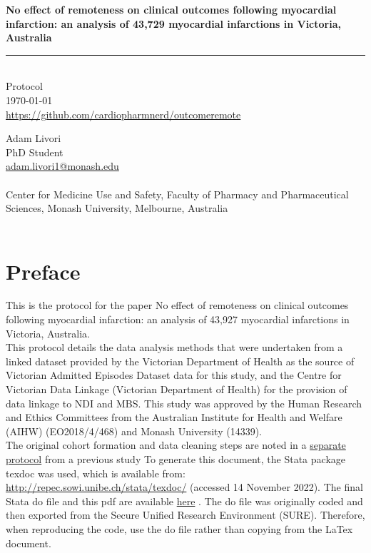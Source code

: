 \documentclass[11pt]{article}
\newcommand{\thedate}{\today}
\begin{document}
\begin{titlepage}
  \begin{flushright}
        \Huge
        \textbf{No effect of remoteness on clinical outcomes following myocardial infarction: an analysis of 43,729 myocardial infarctions in Victoria, Australia}
\color{violet}
\rule{16cm}{2mm} \\
\Large
\color{black}
Protocol \\
\thedate \\
\color{blue}
\url{https://github.com/cardiopharmnerd/outcomeremote} \\
\color{black}
       \vfill
    \end{flushright}
        \Large

\noindent
Adam Livori \\
PhD Student \\
\color{blue}
\href{mailto:adam.livori1@Monash.edu}{adam.livori1@monash.edu} \\ 
\color{black}
\\
Center for Medicine Use and Safety, Faculty of Pharmacy and Pharmaceutical Sciences, Monash University, Melbourne, Australia \\
\\
\end{titlepage}

\pagebreak
\tableofcontents
\pagebreak

\pagebreak
\section{Preface}

This is the protocol for the paper No effect of remoteness on clinical outcomes following myocardial infarction: an analysis of 43,927 myocardial infarctions in Victoria, Australia. \\
This protocol details the data analysis methods that were undertaken from a linked dataset provided by the Victorian Department of Health as the source of Victorian Admitted Episodes Dataset data for this study, and the Centre for Victorian Data Linkage (Victorian Department of Health) for the provision of data linkage to NDI and MBS. This study was approved by the Human Research and Ethics Committees from the Australian Institute for Health and Welfare (AIHW) (EO2018/4/468) and Monash University (14339). \\
The original cohort formation and data cleaning steps are noted in a \color{blue} \href{https://github.com/cardiopharmnerd/medsremote}{separate protocol} from a previous study \color{black}
To generate this document, the Stata package texdoc was used, which is available from: \color{blue} \url{http://repec.sowi.unibe.ch/stata/texdoc/} \color{black} (accessed 14 November 2022). The final Stata do file and this pdf are available \color{blue} \href{https://github.com/cardiopharmnerd/outcomeremote}{here} \color{black}. The do file was originally coded and then exported from the Secure Unified Research Environment (SURE). Therefore, when reproducing the code, use the do file rather than copying from the LaTex document. 
\end{document}
